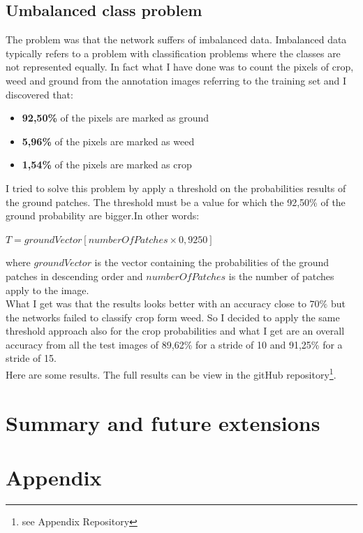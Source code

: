 \documentclass[]{report}
\begin{document}
\section{Umbalanced class problem}

The problem was that the network suffers of imbalanced data. Imbalanced data typically refers to a problem with classification problems where the classes are not represented equally. In fact what I have done was to count the pixels of crop, weed and ground from the annotation images referring to the training set and I discovered that:

\begin{itemize}

	\item \textbf{92,50\%} of the pixels are marked as ground
	\item \textbf{5,96\%} of the pixels are marked as weed
	\item \textbf{1,54\%} of the pixels are marked as crop

\end{itemize}

I tried to solve this problem by apply a threshold on the probabilities results of the ground patches. The threshold must be a value for which the 92,50\% of the ground probability are bigger.In other words:

\begin{center}
	$ T = groundVector[numberOfPatches\times 0,9250] $
\end{center}

where $groundVector $ is the vector containing the probabilities of the ground patches in descending order and $numberOfPatches $ is the number of patches apply to the image.\\
What I get was that the results looks better with an accuracy close to $ 70\% $ but the networks failed to classify crop form weed. So I decided to apply the same threshold approach also for the crop probabilities and what I get are an overall accuracy from all the test images of 89,62\% for a stride of 10 and 91,25\% for a stride of 15.\\
Here are some results. The full results can be view in the gitHub repository\footnote{see Appendix Repository}.


\chapter{Summary and future extensions}

\chapter{Appendix}
\end{document}
